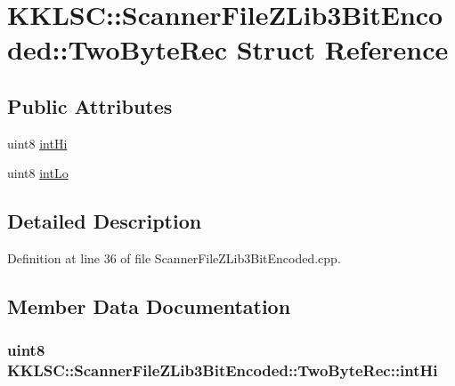 \hypertarget{struct_scanner_file_z_lib3_bit_encoded_1_1_two_byte_rec}{}\section{K\+K\+L\+SC\+:\+:Scanner\+File\+Z\+Lib3\+Bit\+Encoded\+:\+:Two\+Byte\+Rec Struct Reference}
\label{struct_scanner_file_z_lib3_bit_encoded_1_1_two_byte_rec}
\subsection*{Public Attributes}
\begin{DoxyCompactItemize}
\item 
uint8 \hyperlink{struct_scanner_file_z_lib3_bit_encoded_1_1_two_byte_rec_a49ceea0decbf0885121c22257505e226}{int\+Hi}
\item 
uint8 \hyperlink{struct_scanner_file_z_lib3_bit_encoded_1_1_two_byte_rec_af747516492678adfa78692c53c91487c}{int\+Lo}
\end{DoxyCompactItemize}


\subsection{Detailed Description}


Definition at line 36 of file Scanner\+File\+Z\+Lib3\+Bit\+Encoded.\+cpp.



\subsection{Member Data Documentation}
\subsubsection[{\texorpdfstring{int\+Hi}{intHi}}]{\setlength{\rightskip}{0pt plus 5cm}uint8 K\+K\+L\+S\+C\+::\+Scanner\+File\+Z\+Lib3\+Bit\+Encoded\+::\+Two\+Byte\+Rec\+::int\+Hi}\hypertarget{struct_scanner_file_z_lib3_bit_encoded_1_1_two_byte_rec_a49ceea0decbf0885121c22257505e226}{}\label{struct_scanner_file_z_lib3_bit_encoded_1_1_two_byte_rec_a49ceea0decbf0885121c22257505e226}


